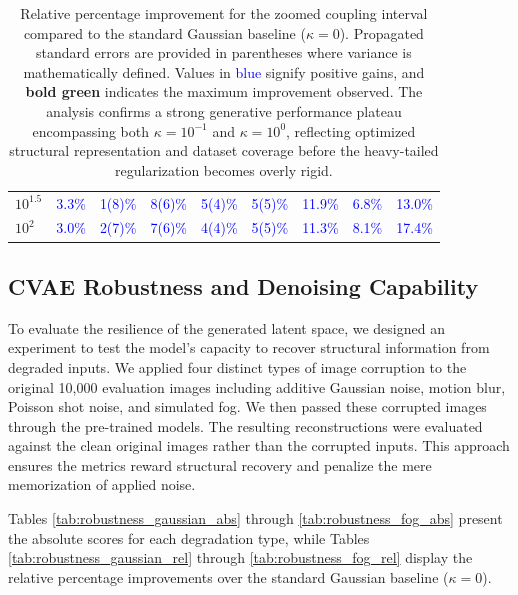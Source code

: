 \documentclass[twoside,11pt]{article}
\begin{document}
\begin{table}[ht!]
\begin{tabular}{lcccccccc}
$10^{1.5}$   & \textcolor{blue}{3.3\%} & \textcolor{blue}{1(8)\%} & \textcolor{blue}{8(6)\%} & \textcolor{blue}{5(4)\%} & \textcolor{blue}{5(5)\%} & \textcolor{blue}{11.9\%} & \textcolor{blue}{6.8\%} & \textcolor{blue}{13.0\%} \\
$10^{2}$     & \textcolor{blue}{3.0\%} & \textcolor{blue}{2(7)\%} & \textcolor{blue}{7(6)\%} & \textcolor{blue}{4(4)\%} & \textcolor{blue}{5(5)\%} & \textcolor{blue}{11.3\%} & \textcolor{blue}{8.1\%} & \textcolor{blue}{17.4\%} \\
\bottomrule
\end{tabular}
\caption{Relative percentage improvement for the zoomed coupling interval compared to the standard Gaussian baseline ($\kappa = 0$). Propagated standard errors are provided in parentheses where variance is mathematically defined. Values in \textcolor{blue}{blue} signify positive gains, and \textbf{\textcolor{green!50!black}{bold green}} indicates the maximum improvement observed. The analysis confirms a strong generative performance plateau encompassing both $\kappa = 10^{-1}$ and $\kappa = 10^0$, reflecting optimized structural representation and dataset coverage before the heavy-tailed regularization becomes overly rigid.}
\label{tab:metrics_improvement_zoom}
\end{table}

\subsection{CVAE Robustness and Denoising Capability}

To evaluate the resilience of the generated latent space, we designed an experiment to test the model's capacity to recover structural information from degraded inputs. We applied four distinct types of image corruption to the original 10,000 evaluation images including additive Gaussian noise, motion blur, Poisson shot noise, and simulated fog. We then passed these corrupted images through the pre-trained models. The resulting reconstructions were evaluated against the clean original images rather than the corrupted inputs. This approach ensures the metrics reward structural recovery and penalize the mere memorization of applied noise.

Tables \ref{tab:robustness_gaussian_abs} through \ref{tab:robustness_fog_abs} present the absolute scores for each degradation type, while Tables \ref{tab:robustness_gaussian_rel} through \ref{tab:robustness_fog_rel} display the relative percentage improvements over the standard Gaussian baseline ($\kappa = 0$). 
\end{document}
